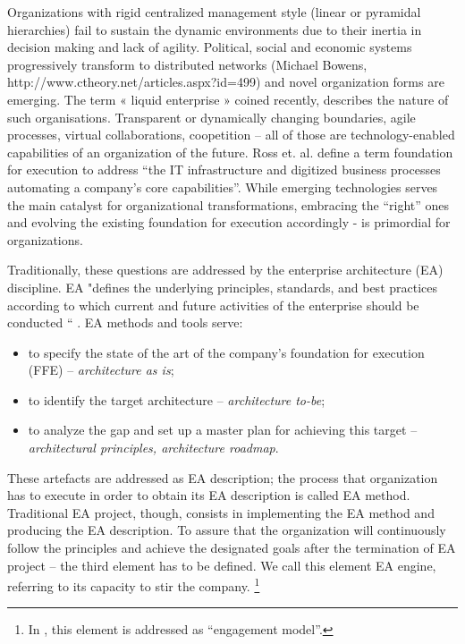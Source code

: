  Organizations with rigid centralized management style (linear or pyramidal hierarchies) fail to sustain the dynamic environments due to their inertia in decision making and lack of agility. Political, social and economic systems progressively transform to distributed networks (Michael Bowens, http://www.ctheory.net/articles.aspx?id=499) and novel organization forms are emerging. 
The term « liquid enterprise » coined recently, describes the nature of such organisations. Transparent or dynamically changing boundaries, agile processes\cite{agileproc}, virtual collaborations, coopetition \cite{coopetition} – all of those are technology-enabled capabilities of an organization of the future. 
Ross et. al. \cite{ross2006} define a term foundation for execution to address “the IT infrastructure and digitized business processes automating a company’s core capabilities”. While emerging technologies serves the main catalyst for organizational transformations, embracing the “right” ones and evolving the existing foundation for execution accordingly - is primordial for organizations. 

Traditionally, these questions are addressed by the enterprise architecture (EA) discipline. EA "defines the underlying principles, standards, and best practices according to which current and future activities of the enterprise should be conducted “ \cite{schekkerman2003}. EA methods and tools serve:
\begin{itemize}
\item to specify the state of the art of the company’s foundation for execution (FFE) – \textit{architecture as is};
\item to identify the target architecture – \textit{architecture to-be};
\item to analyze the gap and set up a master plan for achieving this target – \textit{architectural principles, architecture roadmap}.
\end{itemize}
These artefacts are addressed as EA description; the process that organization has to execute in order to obtain its EA description is called EA method. Traditional EA project, though, consists in implementing the EA method and producing the EA description. To assure that the organization will continuously follow the principles and achieve the designated goals after the termination of EA project – the third element has to be defined. We call this element EA engine, referring to its capacity to stir the company. \footnote{In \cite{ross2006}, this element is addressed as “engagement model”.}

